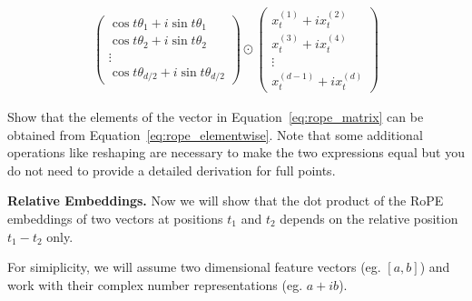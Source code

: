 \begin{parts}
\begin{subparts}
\begin{align}\label{eq:rope_elementwise}
    \begin{pmatrix}
        \cos t\theta_1 + i\sin t\theta_1 \\
        \cos t\theta_2 + i\sin t\theta_2 \\
        \vdots \\
        \cos t\theta_{d/2} + i\sin t\theta_{d/2}
    \end{pmatrix}
    \odot
    \begin{pmatrix}
        x^{(1)}_t + i x^{(2)}_t \\
        x^{(3)}_t + i x^{(4)}_t \\
        \vdots \\
        x^{(d-1)}_t + i x^{(d)}_t
    \end{pmatrix}
\end{align}

Show that the elements of the vector in Equation~\ref{eq:rope_matrix} can be obtained from Equation~\ref{eq:rope_elementwise}. Note that some additional operations like reshaping are necessary to make the two expressions equal but you do not need to provide a detailed derivation for full points. 


\subpart[1] \textbf{Relative Embeddings.} Now we will show that the dot product of the RoPE embeddings of two vectors at positions $t_1$ and $t_2$ depends on the relative position $t_1 - t_2$ only. 

For simiplicity, we will assume two dimensional feature vectors (eg. $[a, b]$) and work with their complex number representations (eg. $a + ib$).


\end{subparts}
\end{parts}
